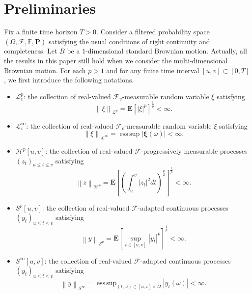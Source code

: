 \documentclass[10pt]{article}%
\numberwithin{equation}{section}
\def \P{\mathbf{P}}
\begin{document}
\section{Preliminaries}

 Fix a finite time horizon $T>0$. Consider a filtered probability space $(\Omega,\mathcal{F},\mathbb{F},\P)$ satisfying the usual conditions of right continuity and completeness. Let $B$ be a $1$-dimensional standard Brownian motion. Actually, all the results in this paper still hold when we consider the multi-dimensional Brownian motion. For each $p>1$ and for any finite time interval $[u,v]\subset [0,T]$, we first introduce the following notations.
 
\begin{itemize}	
\item $\mathcal{L}^p_v$: the collection of real-valued $\mathcal{F}_{v}$-measurable random variable $\xi$ satisfying 
	$$\left \| \xi \right \|_{\mathcal{L}^p}=\mathbf{E} \left [ \left | \xi  \right | ^p \right ]^{\frac{1}{p} }< \infty. $$
	 
	\item $\mathcal{L}^{\infty}_v$: the collection of real-valued $\mathcal{F}_{v}$-measurable random variable $\xi$ satisfying
	 $$\left \| \xi  \right \|_{\mathcal{L}^\infty}=\operatorname{ess\,sup}\left |\mathbf{\xi} \left ( \omega  \right )   \right |<\infty. $$
	
	\item $\mathcal{H}^{p}\left[u,v\right]$: the collection of real-valued $\mathcal{F}$-progressively measurable processes $\left(z_{t}\right)_{u\leq t\leq v}$ satisfying 
	$$\left \| z \right \|_{\mathcal{H}^p }=\mathbf{E}\left [\left ( \int_{u}^{v}\left | z_{t} \right |^2 d t \right )^{\frac{p}{2}}   \right ]^{\frac{1}{p} }<\infty. $$
	
	\item $S^p\left[u,v\right]$: the collection of real-valued $\mathcal{F}$-adapted continuous processes $\left(y_{t}\right)_{u\leq t \leq v}$ satisfying 
	$$ \left \| y \right \|_{\mathcal{S}^p }=\mathbf{E}\left [ \sup _{t\in[u,v]} \left | y_{t} \right |^p \right ]^{\frac{1}{p}}  <\infty.$$
	
	\item $S^{\infty}\left[u,v\right]$: the collection of real-valued $\mathcal{F}$-adapted continuous processes $\left(y_{t}\right)_{u\leq t \leq v}$ satisfying
	$$\left \| y \right \|_{\mathcal{S}^{\infty } } =\operatorname{ess\,sup}_{(t,\omega)\in\left[u,v\right]\times\Omega}\left | y_t\left (\omega\right )  \right |  <\infty.$$
	

\end{itemize}
\end{document}
